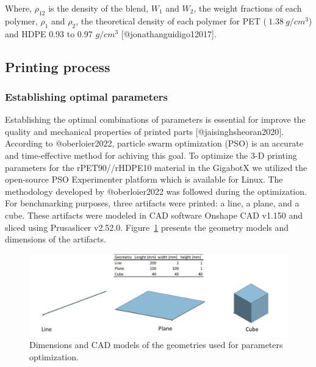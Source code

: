 \documentclass[
  letterpaper,
  DIV=11,
  numbers=noendperiod]{scrartcl}
\begin{document}
Where, \(\rho_{12}\) is the density of the blend, \(W_{1}\) and
\(W_{2}\), the weight fractions of each polymer, \(\rho_{1}\) and
\(\rho_{2}\), the theoretical density of each polymer for PET
(\(~1.38~g/cm^{3}\)) and HDPE 0.93 to 0.97 \(g/cm^{3}\)
{[}@jonathanguidigo12017{]}.

\hypertarget{printing-process}{%
\subsection{Printing process}\label{printing-process}}

\hypertarget{establishing-optimal-parameters}{%
\subsubsection{Establishing optimal
parameters}\label{establishing-optimal-parameters}}

Establishing the optimal combinations of parameters is essential for
improve the quality and mechanical properties of printed parts
{[}@jaisinghsheoran2020{]}. According to @oberloier2022, particle swarm
optimization (PSO) is an accurate and time-effective method for achiving
this goal. To optimize the 3-D printing parameters for the
rPET90//rHDPE10 material in the GigabotX we utilized the open-source PSO
Experimenter platform which is available for Linux. The methodology
developed by @oberloier2022 was followed during the optimization. For
benchmarking purposes, three artifacts were printed: a line, a plane,
and a cube. These artifacts were modeled in CAD software Onshape CAD
v1.150 and sliced using Prusaslicer v2.52.0. Figure~\ref{fig-cad}
presents the geometry models and dimensions of the artifacts.

\begin{figure}

{\centering \includegraphics{figures/Figure-2.png}

}

\caption{\label{fig-cad}Dimensions and CAD models of the geometries used
for parameters optimization.}

\end{figure}
\end{document}
